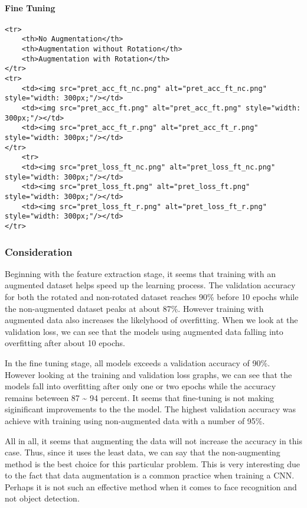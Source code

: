 \documentclass[11pt]{article}
\begin{document}
    \paragraph{Fine Tuning}\label{fine-tuning}

\begin{verbatim}
<tr>
    <th>No Augmentation</th>
    <th>Augmentation without Rotation</th>
    <th>Augmentation with Rotation</th>
</tr>
<tr>
    <td><img src="pret_acc_ft_nc.png" alt="pret_acc_ft_nc.png" style="width: 300px;"/></td>
    <td><img src="pret_acc_ft.png" alt="pret_acc_ft.png" style="width: 300px;"/></td>
    <td><img src="pret_acc_ft_r.png" alt="pret_acc_ft_r.png" style="width: 300px;"/></td>
</tr>
    <tr>
    <td><img src="pret_loss_ft_nc.png" alt="pret_loss_ft_nc.png" style="width: 300px;"/></td>
    <td><img src="pret_loss_ft.png" alt="pret_loss_ft.png" style="width: 300px;"/></td>
    <td><img src="pret_loss_ft_r.png" alt="pret_loss_ft_r.png" style="width: 300px;"/></td>
</tr>
\end{verbatim}

    \subsubsection{Consideration}\label{consideration}

Beginning with the feature extraction stage, it seems that training with
an augmented dataset helps speed up the learning process. The validation
accuracy for both the rotated and non-rotated dataset reaches 90\%
before 10 epochs while the non-augmented dataset peaks at about 87\%.
However training with augmented data also increases the likelyhood of
overfitting. When we look at the validation loss, we can see that the
models using augmented data falling into overfitting after about 10
epochs.

In the fine tuning stage, all models exceeds a validation accuracy of
90\%. However looking at the training and validation loss graphs, we can
see that the models fall into overfitting after only one or two epochs
while the accuracy remains beteween 87 \textasciitilde{} 94 percent. It
seems that fine-tuning is not making siginificant improvements to the
the model. The highest validation accuracy was achieve with training
using non-augmented data with a number of 95\%.

All in all, it seems that augmenting the data will not increase the
accuracy in this case. Thus, since it uses the least data, we can say
that the non-augmenting method is the best choice for this particular
problem. This is very interesting due to the fact that data augmentation
is a common practice when training a CNN. Perhaps it is not such an
effective method when it comes to face recognition and not object
detection.
\end{document}

